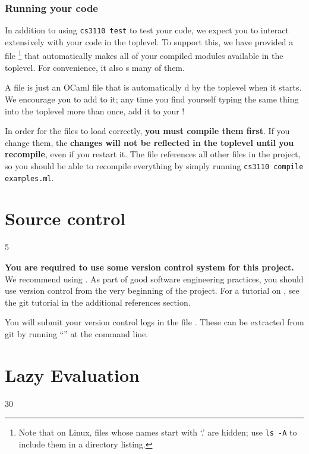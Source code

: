 \documentclass{pset}
\begin{document}
\section*{Running your code}

In addition to using \texttt{cs3110 test} to test your code, we expect you to
interact extensively with your code in the toplevel.  To support this, we have
provided a  file%
\footnote{Note that on Linux, files whose names start with `.' are hidden; use
          \texttt{ls -A} to include them in a directory listing.}%
that automatically makes all of your compiled modules available in the
toplevel.  For convenience, it also s many of them.

A  file is just an OCaml file that is automatically
d by the toplevel when it starts.  We encourage you to add to it; any
time you find yourself typing the same thing into the toplevel more than once,
add it to your !

In order for the files to load correctly, \textbf{you must compile them first}.
If you change them, the \textbf{changes will not be reflected in the toplevel
until you recompile}, even if you restart it.  The file 
references all other files in the project, so you should be able to recompile
everything by simply running \texttt{cs3110 compile examples.ml}.

\newpage{}
\part{Source control}{5}
\label{part:git}

\textbf{You are required to use some version control system for this project.} We
recommend using . As part of good software engineering practices, you should
use version control from the very beginning of the project.
For a tutorial on , see the git tutorial in the additional
references section.

You will submit your version control logs in the file .  These can be
extracted from git by running ``'' at the
command line.


\part{Lazy Evaluation}{30}
\label{part:streams}
\end{document}
